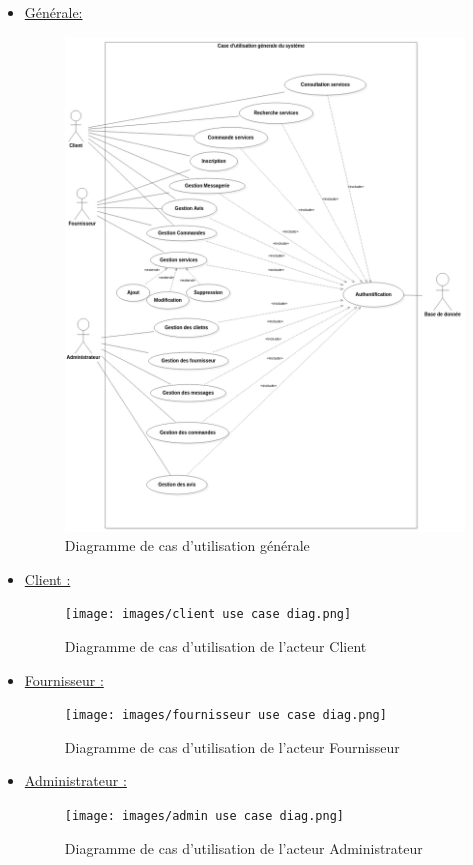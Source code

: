 \documentclass[french]{report}
\begin{document}
\begin{itemize}
    \item \underline{Générale:}
        \begin{figure}[H]
            \centering
            \includegraphics[width=1.1\textwidth]{images/use case.png}
            \caption{Diagramme de cas d'utilisation générale}
            \label{fig:general_use_case}
        \end{figure}
        
    \item \underline{Client :} 
        \begin{figure}[H]
            \centering
            \texttt{[image: images/client use case diag.png]}
            \caption{Diagramme de cas d'utilisation de l'acteur Client}
            \label{fig:client_use_case}
        \end{figure}
    \item \underline{Fournisseur :}
        \begin{figure}[H]
            \centering
            \texttt{[image: images/fournisseur use case diag.png]}
            \caption{Diagramme de cas d'utilisation de l'acteur Fournisseur}
            \label{fig:fournisseur_use_case}
        \end{figure}
    \item \underline{Administrateur :}
        \begin{figure}[H]
            \centering
            \texttt{[image: images/admin use case diag.png]}
            \caption{Diagramme de cas d'utilisation de l'acteur Administrateur}
            \label{fig:admin_use_case}
        \end{figure}
\end{itemize}
\end{document}
